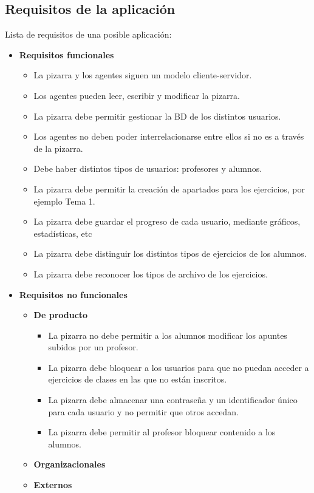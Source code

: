 \subsection{Requisitos de la aplicación}

Lista de requisitos de una posible aplicación:

\begin{itemize}
\item \textbf{Requisitos funcionales}
		\begin{itemize}
			\item La pizarra y los agentes siguen un modelo cliente-servidor.
			\item Los agentes pueden leer, escribir y modificar la pizarra.
			\item La pizarra debe permitir gestionar la BD de los distintos usuarios.
			\item Los agentes no deben poder interrelacionarse entre ellos si no es a través de la pizarra.
			\item Debe haber distintos tipos de usuarios: profesores y alumnos.
			\item La pizarra debe permitir la creación de apartados para los ejercicios, por ejemplo Tema 1.
			\item La pizarra debe guardar el progreso de cada usuario, mediante gráficos, estadísticas, etc
			\item La pizarra debe distinguir los distintos tipos de ejercicios de los alumnos.
			\item La pizarra debe reconocer los tipos de archivo de los ejercicios.
		\end{itemize}
\item \textbf{Requisitos no funcionales}
		\begin{itemize}
			\item \textbf{De producto}
					\begin{itemize}
					\item La pizarra no debe permitir a los alumnos modificar los apuntes subidos por un profesor.
					\item La pizarra debe bloquear a los usuarios para que no puedan acceder a ejercicios de clases en las que no están inscritos.
					\item La pizarra debe almacenar una contraseña y un identificador único para cada usuario y no permitir que otros accedan.
					\item La pizarra debe permitir al profesor bloquear contenido a los alumnos.
					\end{itemize}
			\item \textbf{Organizacionales}
			\item \textbf{Externos}
		\end{itemize}
\end{itemize}

